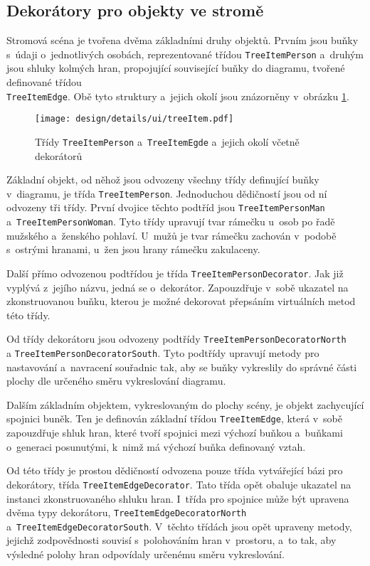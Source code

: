 		\subsection*{Dekorátory pro objekty ve stromě}
		Stromová scéna je tvořena dvěma základními druhy objektů. Prvním jsou buňky s~údaji o~jednotlivých osobách, reprezentované třídou \texttt{TreeItemPerson} a~druhým jsou shluky kolmých hran, propojující související buňky do diagramu, tvořené definované třídou\\ \texttt{TreeItemEdge}. Obě tyto struktury a~jejich okolí jsou znázorněny v~obrázku \ref{fig:designDetailTreeItem}. \par
		\begin{figure}[h]
			\centering
			\texttt{[image: design/details/ui/treeItem.pdf]}
			\caption{Třídy \texttt{TreeItemPerson} a~\texttt{TreeItemEgde} a~jejich okolí včetně dekorátorů}
			\label{fig:designDetailTreeItem}
		\end{figure}
		Základní objekt, od něhož jsou odvozeny všechny třídy definující buňky v~diagramu, je třída \texttt{TreeItemPerson}. Jednoduchou dědičností jsou od ní odvozeny tři třídy. První dvojice těchto podtříd jsou \texttt{TreeItemPersonMan} a~\texttt{TreeItemPersonWoman}. Tyto třídy upravují tvar rámečku u~osob po řadě mužského a~ženského pohlaví. U~mužů je tvar rámečku zachován v~podobě s~ostrými hranami, u~žen jsou hrany rámečku zakulaceny.\par
		Další přímo odvozenou podtřídou je třída \texttt{TreeItemPersonDecorator}. Jak již vyplývá z~jejího názvu, jedná se o~dekorátor. Zapouzdřuje v~sobě ukazatel na zkonstruovanou buňku, kterou je možné dekorovat přepsáním virtuálních metod této třídy.\par
		Od třídy dekorátoru jsou odvozeny podtřídy \texttt{TreeItemPersonDecoratorNorth} \\a \texttt{TreeItemPersonDecoratorSouth}. Tyto podtřídy upravují metody pro nastavování a~navracení souřadnic tak, aby se buňky vykreslily do správné části plochy dle určeného směru vykreslování diagramu. \par
		Dalším základním objektem, vykreslovaným do plochy scény, je objekt zachycující spojnici buněk. Ten je definován základní třídou \texttt{TreeItemEdge}, která v~sobě zapouzdřuje shluk hran, které tvoří spojnici mezi výchozí buňkou a~buňkami o~generaci posunutými, k~nimž má výchozí buňka definovaný vztah.\par
		Od této třídy je prostou dědičností odvozena pouze třída vytvářející bázi pro dekorátory, třída \texttt{TreeItemEdgeDecorator}. Tato třída opět obaluje ukazatel na instanci zkonstruovaného shluku hran.
		I~třída pro spojnice může být upravena dvěma typy dekorátoru, \texttt{TreeItemEdgeDecoratorNorth} a~\texttt{TreeItemEdgeDecoratorSouth}. V~těchto třídách jsou opět upraveny metody, jejichž zodpovědnosti souvisí s~polohováním hran v~prostoru, a~to tak, aby výsledné polohy hran odpovídaly určenému směru vykreslování.\par	
		
